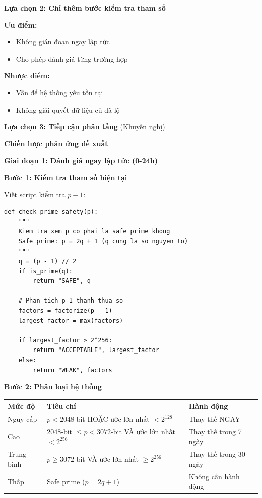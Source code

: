 \textbf{Lựa chọn 2: Chỉ thêm bước kiểm tra tham số}

\textbf{Ưu điểm:}
\begin{itemize}
    \item Không gián đoạn ngay lập tức
    \item Cho phép đánh giá từng trường hợp
\end{itemize}

\textbf{Nhược điểm:}
\begin{itemize}
    \item Vẫn để hệ thống yếu tồn tại
    \item Không giải quyết dữ liệu cũ đã lộ
\end{itemize}

\textbf{Lựa chọn 3: Tiếp cận phân tầng} (Khuyến nghị)

\textbf{Chiến lược phản ứng đề xuất}

\textbf{Giai đoạn 1: Đánh giá ngay lập tức (0-24h)}

\textbf{Bước 1: Kiểm tra tham số hiện tại}

Viết script kiểm tra $p-1$:

\begin{verbatim}
def check_prime_safety(p):
    """
    Kiem tra xem p co phai la safe prime khong
    Safe prime: p = 2q + 1 (q cung la so nguyen to)
    """
    q = (p - 1) // 2
    if is_prime(q):
        return "SAFE", q
    
    # Phan tich p-1 thanh thua so
    factors = factorize(p - 1)
    largest_factor = max(factors)
    
    if largest_factor > 2^256:
        return "ACCEPTABLE", largest_factor
    else:
        return "WEAK", factors
\end{verbatim}

\textbf{Bước 2: Phân loại hệ thống}

\begin{center}
\begin{tabular}{|p{2.5cm}|p{5cm}|p{4cm}|}
\hline
\textbf{Mức độ} & \textbf{Tiêu chí} & \textbf{Hành động} \\
\hline
Nguy cấp & $p < 2048$-bit HOẶC ước lớn nhất $< 2^{128}$ & Thay thế NGAY \\
Cao & $2048$-bit $\leq p < 3072$-bit VÀ ước lớn nhất $< 2^{256}$ & Thay thế trong 7 ngày \\
Trung bình & $p \geq 3072$-bit VÀ ước lớn nhất $\geq 2^{256}$ & Thay thế trong 30 ngày \\
Thấp & Safe prime ($p = 2q + 1$) & Không cần hành động \\
\hline
\end{tabular}
\end{center}

